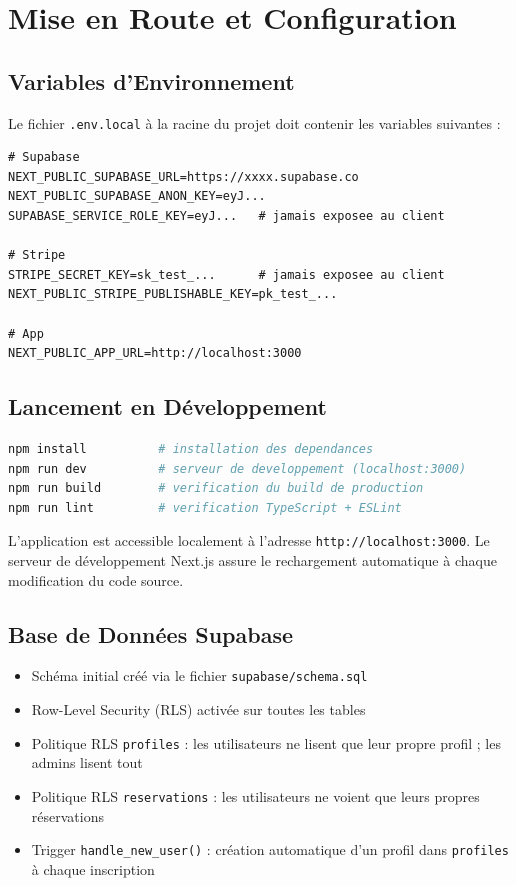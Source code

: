 \documentclass[12pt,a4paper,openany]{report}
\begin{document}
\chapter{Mise en Route et Configuration}

\section{Variables d'Environnement}

Le fichier \texttt{.env.local} à la racine du projet doit contenir les variables suivantes :

\begin{lstlisting}
# Supabase
NEXT_PUBLIC_SUPABASE_URL=https://xxxx.supabase.co
NEXT_PUBLIC_SUPABASE_ANON_KEY=eyJ...
SUPABASE_SERVICE_ROLE_KEY=eyJ...   # jamais exposee au client

# Stripe
STRIPE_SECRET_KEY=sk_test_...      # jamais exposee au client
NEXT_PUBLIC_STRIPE_PUBLISHABLE_KEY=pk_test_...

# App
NEXT_PUBLIC_APP_URL=http://localhost:3000
\end{lstlisting}

\section{Lancement en Développement}

\begin{lstlisting}[language=bash]
npm install          # installation des dependances
npm run dev          # serveur de developpement (localhost:3000)
npm run build        # verification du build de production
npm run lint         # verification TypeScript + ESLint
\end{lstlisting}

L'application est accessible localement à l'adresse \texttt{http://localhost:3000}. Le serveur de développement Next.js assure le rechargement automatique à chaque modification du code source.

\section{Base de Données Supabase}

\begin{itemize}
  \item Schéma initial créé via le fichier \texttt{supabase/schema.sql}
  \item Row-Level Security (RLS) activée sur toutes les tables
  \item Politique RLS \texttt{profiles} : les utilisateurs ne lisent que leur propre profil ; les admins lisent tout
  \item Politique RLS \texttt{reservations} : les utilisateurs ne voient que leurs propres réservations
  \item Trigger \texttt{handle\_new\_user()} : création automatique d'un profil dans \texttt{profiles} à chaque inscription
\end{itemize}
\end{document}
